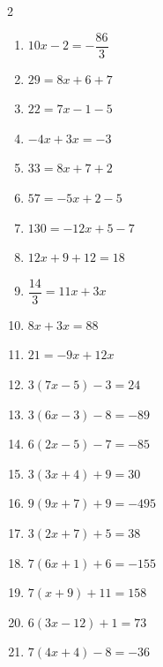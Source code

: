 \documentclass[11pt]{article}
\begin{document}
\begin{multicols}{2}
\begin{enumerate}
  \item $10x - 2 = -\dfrac{86}{3}$
  \vspace{1.4cm}
  \item $29 = 8x + 6 + 7$
  \vspace{1.4cm}
  \item $22 = 7x - 1 - 5$
  \vspace{1.4cm}
  \item $-4x + 3x = -3$
  \vspace{1.4cm}
  \item $33 = 8x + 7 + 2$
  \vspace{1.4cm}
  \item $57 = -5x + 2 - 5$
  \vspace{1.4cm}
  \item $130 = -12x + 5 - 7$
  \vspace{1.4cm}
  \item $12x + 9 + 12 = 18$
  \vspace{1.4cm}
  \item $\dfrac{14}{3} = 11x + 3x$
  \vspace{1.4cm}
  \item $8x + 3x = 88$
  \vspace{1.4cm}
  \item $21 = -9x + 12x$
  \vspace{1.4cm}
  \item $3(7x - 5) - 3 = 24$
  \vspace{1.4cm}
  \item $3(6x - 3) - 8 = -89$
  \vspace{1.4cm}
  \item $6(2x - 5) - 7 = -85$
  \vspace{1.4cm}
  \item $3(3x + 4) + 9 = 30$
  \vspace{1.4cm}
  \item $9(9x + 7) + 9 = -495$
  \vspace{1.4cm}
  \item $3(2x + 7) + 5 = 38$
  \vspace{1.4cm}
  \item $7(6x + 1) + 6 = -155$
  \vspace{1.4cm}
  \item $7(x + 9) + 11 = 158$
  \vspace{1.4cm}
  \item $6(3x - 12) + 1 = 73$
  \vspace{1.4cm}
  \item $7(4x + 4) - 8 = -36$
  \vspace{1.4cm}

\end{enumerate}
\end{multicols}
\end{document}
